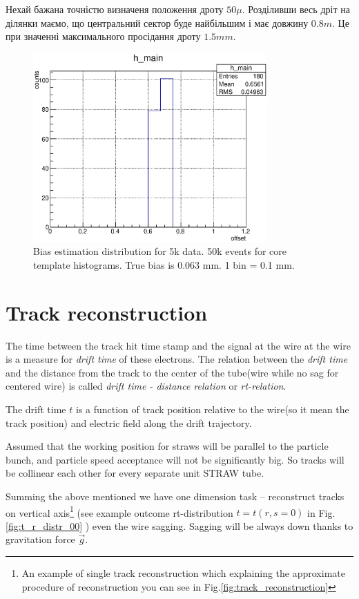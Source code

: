 \documentclass[]{article}
\begin{document}
	Нехай бажана точністю визначеня положення дроту $50 \mu$. Розділивши весь дріт на ділянки маємо, що центральний сектор буде найбільшим і має довжину $0.8 m$. Це при значенні максимального просідання дроту $1.5 mm$.
	
	
	\begin{figure}[h]
	\includegraphics[width=0.8\textwidth]{chi_063_5k.eps}
	\centering
	\caption{ Bias estimation distribution for 5k data. 50k events for core template histograms. True bias is 0.063 mm. 1 bin = 0.1 mm. } 
	\label{fig:chi_063_5k}
	\end{figure}
	
	
	\section{Track reconstruction}
	
	 The time between the track hit time stamp and the signal at the wire at the wire is a measure for {\it drift time} of these electrons. The relation between the   {\it drift time} and  the distance from the track to the center of the tube(wire while no sag for centered wire) is called {\it drift time - distance relation} or {\it rt-relation}.
	
	The drift time $t$ is a function of track position relative to the wire(so it mean the track position) and electric field along the drift trajectory.
	
	Assumed that the working  position  for straws will be parallel to the particle bunch, and particle speed acceptance will not be significantly big. So tracks will be collinear each other for every separate unit STRAW tube.
	
	Summing the above mentioned we have one dimension task -- reconstruct tracks on vertical axis\footnote{An example of single track reconstruction which explaining the approximate procedure of reconstruction you can see in Fig.\ref{fig:track_reconstruction}}
	(see example outcome rt-distribution $t = t(r,s=0)$ in Fig.\ref{fig:t_r_distr_00} ) even the wire sagging. Sagging will be always down thanks to gravitation force $\vec{g}$.
	
\end{document}
